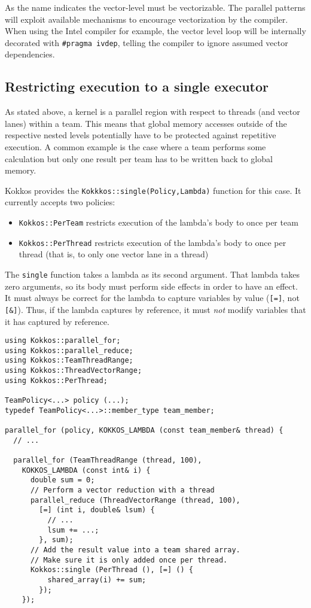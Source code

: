 \begin{enumerate}
As the name indicates the vector-level must be vectorizable. 
The parallel patterns will exploit available mechanisms to encourage vectorization by the compiler. 
When using the Intel compiler for example, the vector level loop will be internally decorated with 
\lstinline|#pragma ivdep|, telling the compiler to ignore assumed vector dependencies.

\subsection{Restricting execution to a single executor}

As stated above, a kernel is a parallel region with respect to threads (and vector lanes) within a team.
This means that global memory accesses outside of the respective nested levels potentially have to be protected against repetitive execution. 
A common example is the case where a team performs some calculation but only one result per team has to be written back to global memory. 

Kokkos provides the \lstinline|Kokkkos::single(Policy,Lambda)| function for this case.
It currently accepts two policies:
\begin{itemize}
\item \lstinline|Kokkos::PerTeam| restricts execution of the lambda's
  body to once per team
\item \lstinline|Kokkos::PerThread| restricts execution of the
  lambda's body to once per thread (that is, to only one vector lane
  in a thread)
\end{itemize}
The \lstinline|single| function takes a lambda as its second argument.
That lambda takes zero arguments, 
so its body must perform side effects in order to have an effect.
It must always be correct for the lambda to capture variables by value
(\lstinline|[=]|, not \lstinline|[&]|).
Thus, if the lambda captures by reference,
it must \emph{not} modify variables that it has captured by reference.

\begin{lstlisting}
using Kokkos::parallel_for;
using Kokkos::parallel_reduce;
using Kokkos::TeamThreadRange;
using Kokkos::ThreadVectorRange;
using Kokkos::PerThread;

TeamPolicy<...> policy (...);
typedef TeamPolicy<...>::member_type team_member;

parallel_for (policy, KOKKOS_LAMBDA (const team_member& thread) {
  // ...

  parallel_for (TeamThreadRange (thread, 100), 
    KOKKOS_LAMBDA (const int& i) {
      double sum = 0;
      // Perform a vector reduction with a thread
      parallel_reduce (ThreadVectorRange (thread, 100), 
        [=] (int i, double& lsum) {
          // ...
          lsum += ...;
        }, sum);
      // Add the result value into a team shared array.
      // Make sure it is only added once per thread.
      Kokkos::single (PerThread (), [=] () {
          shared_array(i) += sum;
        });
    });
  

\end{lstlisting}
\end{enumerate}
